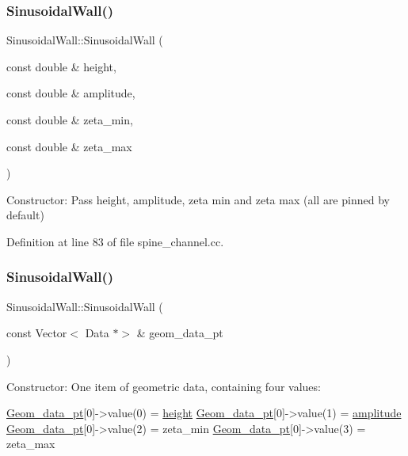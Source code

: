 \subsubsection{\texorpdfstring{Sinusoidal\+Wall()}{SinusoidalWall()}\hspace{0.1cm}{\footnotesize\ttfamily [1/2]}}
{\footnotesize\ttfamily Sinusoidal\+Wall\+::\+Sinusoidal\+Wall (\begin{DoxyParamCaption}\item[{const double \&}]{height,  }\item[{const double \&}]{amplitude,  }\item[{const double \&}]{zeta\+\_\+min,  }\item[{const double \&}]{zeta\+\_\+max }\end{DoxyParamCaption})\hspace{0.3cm}{\ttfamily [inline]}}



Constructor\+: Pass height, amplitude, zeta min and zeta max (all are pinned by default) 



Definition at line 83 of file spine\+\_\+channel.\+cc.

\mbox{\label{classSinusoidalWall_ac437fb52cca5a1b467f6f87ecc2c75aa}} 
\subsubsection{\texorpdfstring{Sinusoidal\+Wall()}{SinusoidalWall()}\hspace{0.1cm}{\footnotesize\ttfamily [2/2]}}
{\footnotesize\ttfamily Sinusoidal\+Wall\+::\+Sinusoidal\+Wall (\begin{DoxyParamCaption}\item[{const Vector$<$ Data $\ast$$>$ \&}]{geom\+\_\+data\+\_\+pt }\end{DoxyParamCaption})\hspace{0.3cm}{\ttfamily [inline]}}



Constructor\+: One item of geometric data, containing four values\+: 


\begin{DoxyCode}
\hyperlink{classSinusoidalWall_a1d8226424f058dff0234e65a6e288a39}{Geom\_data\_pt}[0]->value(0) = \hyperlink{classSinusoidalWall_a78861ab97b81bc78e05c3ec260c6479d}{height}
\hyperlink{classSinusoidalWall_a1d8226424f058dff0234e65a6e288a39}{Geom\_data\_pt}[0]->value(1) = \hyperlink{classSinusoidalWall_a654a7ccf081040971442d8534f1e6807}{amplitude}
\hyperlink{classSinusoidalWall_a1d8226424f058dff0234e65a6e288a39}{Geom\_data\_pt}[0]->value(2) = zeta\_min
\hyperlink{classSinusoidalWall_a1d8226424f058dff0234e65a6e288a39}{Geom\_data\_pt}[0]->value(3) = zeta\_max
\end{DoxyCode}
 


